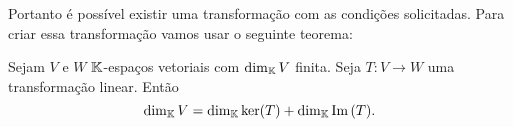 \documentclass[12pt]{exam}
\begin{document}
    Portanto é possível existir uma transforma\c{c}ão com as condi\c{c}ões solicitadas. Para criar essa transforma\c{c}ão vamos usar o seguinte teorema:

    \begin{tcolorbox}[colback=green!30, colframe=green!80!blue, title=Teorema do Núcleo e da Imagem]
        Sejam $V$ e $W$ $\mathbb{K}$-espa\c{c}os vetoriais com $\dim_{\mathbb{K}}V$ finita. Seja $T : V \to W$ uma transforma\c{c}ão linear. Então
        \[
            \dim_{\mathbb{K}}V = \dim_{\mathbb{K}}\ker(T) + \dim_{\mathbb{K}}{\rm Im\,}(T).
        \]
    \end{tcolorbox}
\end{document}
